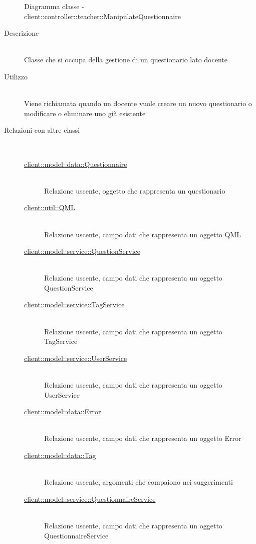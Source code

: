 \begin{figure}[H]
	\caption{Diagramma classe - client::controller::teacher::ManipulateQuestionnaire}
\end{figure}\begin{description}
\item[Descrizione] \hfill \\
Classe che si occupa della gestione di un questionario lato docente
\item[Utilizzo] \hfill \\
Viene richiamata quando un docente vuole creare un nuovo questionario o modificare o eliminare uno già esistente
\item[Relazioni con altre classi] \hfill \\
\vspace{-7mm}
\begin{description}
	\item[\hyperlink{client::model::data::Questionnaire}{client::model::data::Questionnaire}] \hfill \\
	Relazione uscente, oggetto che rappresenta un questionario
	\item[\hyperlink{client::util::QML}{client::util::QML}] \hfill \\
	Relazione uscente, campo dati che rappresenta un oggetto QML
	\item[\hyperlink{client::model::service::QuestionService}{client::model::service::QuestionService}] \hfill \\
	Relazione uscente, campo dati che rappresenta un oggetto QuestionService
	\item[\hyperlink{client::model::service::TagService}{client::model::service::TagService}] \hfill \\
	Relazione uscente, campo dati che rappresenta un oggetto TagService
	\item[\hyperlink{client::model::service::UserService}{client::model::service::UserService}] \hfill \\
	Relazione uscente, campo dati che rappresenta un oggetto UserService
	\item[\hyperlink{client::model::data::Error}{client::model::data::Error}] \hfill \\
	Relazione uscente, campo dati che rappresenta un oggetto Error
	\item[\hyperlink{client::model::data::Tag}{client::model::data::Tag}] \hfill \\
	Relazione uscente, argomenti che compaiono nei suggerimenti
	\item[\hyperlink{client::model::service::QuestionnaireService}{client::model::service::QuestionnaireService}] \hfill \\
	Relazione uscente, campo dati che rappresenta un oggetto QuestionnaireService
\end{description}


\end{description}
